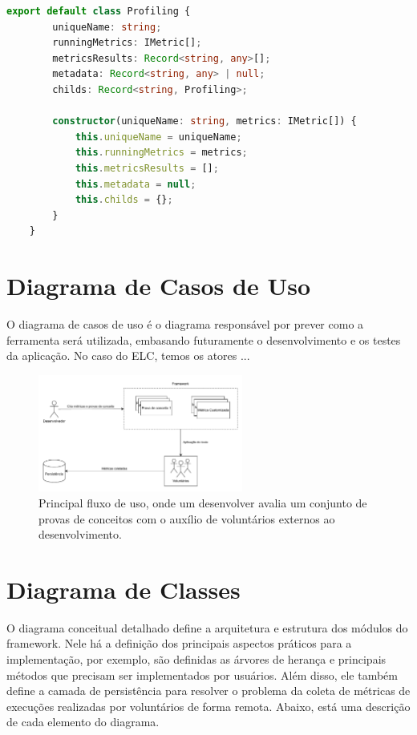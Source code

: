 \documentclass[12pt]{tcc}
\begin{document}
	\begin{lstlisting}[label={lst:easyelc_profiling_class}, caption={Implementação do nó da árvore de análises usado no EasyElc.}, language=TypeScript, breaklines=true]
	export default class Profiling {
		uniqueName: string;
		runningMetrics: IMetric[];
		metricsResults: Record<string, any>[];
		metadata: Record<string, any> | null;
		childs: Record<string, Profiling>;

		constructor(uniqueName: string, metrics: IMetric[]) {
			this.uniqueName = uniqueName;
			this.runningMetrics = metrics;
			this.metricsResults = [];
			this.metadata = null;
			this.childs = {};
		}
	}
	\end{lstlisting}



	\section{Diagrama de Casos de Uso}
	\label{sec:diagrama_de_caso_de_uso}

	O diagrama de casos de uso é o diagrama responsável por prever como a ferramenta será utilizada, embasando futuramente o desenvolvimento e os testes da aplicação. No caso do ELC, temos os atores ...

	\begin{figure}[!ht]
		\centering
		\includegraphics[width=0.6\textwidth]{figures/diagrama-informal.pdf}
		\caption{Principal fluxo de uso, onde um desenvolver avalia um conjunto de provas de conceitos com o auxílio de voluntários externos ao desenvolvimento.}
		\label{fig:diagrama-informal}
	\end{figure}

		
	\section{Diagrama de Classes}
	\label{cap:diagrama_de_classe}


	O diagrama conceitual detalhado define a arquitetura e estrutura dos módulos do framework.
	Nele há a definição dos principais aspectos práticos para a implementação, por exemplo, são definidas as árvores de herança e principais métodos que precisam ser implementados por usuários.
	Além disso, ele também define a camada de persistência para resolver o problema da coleta de métricas de execuções realizadas por voluntários de forma remota.
	Abaixo, está uma descrição de cada elemento do diagrama.
\end{document}
